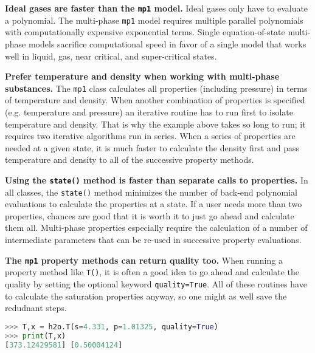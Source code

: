 {\bf Ideal gases are faster than the \texttt{mp1} model.}  Ideal gases only have to evaluate a polynomial.  The multi-phase \texttt{mp1} model requires multiple parallel polynomials with computationally expensive exponential terms.  Single equation-of-state multi-phase models sacrifice computational speed in favor of a single model that works well in liquid, gas, near critical, and super-critical states.

{\bf Prefer temperature and density when working with multi-phase substances.}  The \texttt{mp1} class calculates all properties (including pressure) in terms of temperature and density.  When another combination of properties is specified (e.g. temperature and pressure) an iterative routine has to run first to isolate temperature and density.  That is why the example above takes so long to run; it requires two iterative algorithms run in series.  When a series of properties are needed at a given state, it is much faster to calculate the density first and pass temperature and density to all of the successive property methods.

{\bf Using the \texttt{state()} method is faster than separate calls to properties.}  In all classes, the \verb|state()| method minimizes the number of back-end polynomial evaluations to calculate the properties at a state.  If a user needs more than two properties, chances are good that it is worth it to just go ahead and calculate them all.  Multi-phase properties especially require the calculation of a number of intermediate parameters that can be re-used in successive property evaluations.

{\bf The \texttt{mp1} property methods can return quality too.}  When running a property method like \verb|T()|, it is often a good idea to go ahead and calculate the quality by setting the optional keyword \verb|quality=True|.  All of these routines have to calculate the saturation properties anyway, so one might as well save the redudnant steps.
\begin{lstlisting}[language=Python]
>>> T,x = h2o.T(s=4.331, p=1.01325, quality=True)
>>> print(T,x)
[373.12429581] [0.50004124]
\end{lstlisting}
